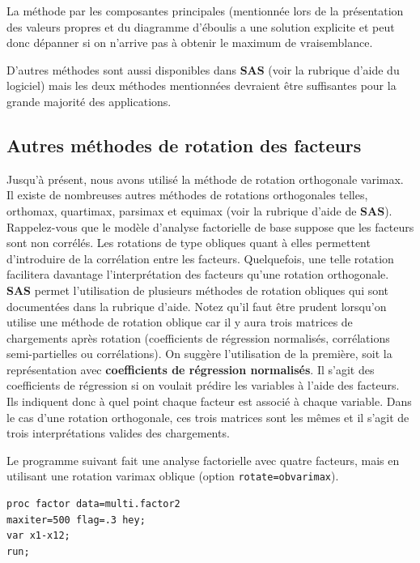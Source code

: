 \documentclass[
  11pt,
  letterpaper,
]{book}
\theoremstyle{definition}
\theoremstyle{definition}
\theoremstyle{definition}
\theoremstyle{remark}
\begin{document}
La méthode par les composantes principales (mentionnée lors de la présentation des valeurs propres et du diagramme d'éboulis a une solution explicite et peut donc dépanner si on n'arrive pas à obtenir le maximum de vraisemblance.

D'autres méthodes sont aussi disponibles dans \textbf{SAS} (voir la rubrique d'aide du logiciel) mais les deux méthodes mentionnées devraient être suffisantes pour la grande majorité des applications.

\hypertarget{autres-muxe9thodes-de-rotation-des-facteurs}{%
\subsection{Autres méthodes de rotation des facteurs}\label{autres-muxe9thodes-de-rotation-des-facteurs}}

Jusqu'à présent, nous avons utilisé la méthode de rotation orthogonale varimax. Il existe de nombreuses autres méthodes de rotations orthogonales telles, orthomax, quartimax, parsimax et equimax (voir la rubrique d'aide de \textbf{SAS}). Rappelez-vous que le modèle d'analyse factorielle de base suppose que les facteurs sont non corrélés. Les rotations de type obliques quant à elles permettent d'introduire de la corrélation entre les facteurs. Quelquefois, une telle rotation facilitera davantage l'interprétation des facteurs qu'une rotation orthogonale. \textbf{SAS} permet l'utilisation de plusieurs méthodes de rotation obliques qui sont documentées dans la rubrique d'aide. Notez qu'il faut être prudent lorsqu'on utilise une méthode de rotation oblique car il y aura trois matrices de chargements après rotation (coefficients de régression normalisés, corrélations semi-partielles ou corrélations). On suggère l'utilisation de la première, soit la représentation avec \textbf{coefficients de régression normalisés}. Il s'agit des coefficients de régression si on voulait prédire les variables à l'aide des facteurs. Ils indiquent donc à quel point chaque facteur est associé à chaque variable. Dans le cas d'une rotation orthogonale, ces trois matrices sont les mêmes et il s'agit de trois interprétations valides des chargements.

Le programme suivant fait une analyse factorielle avec quatre facteurs, mais en utilisant une rotation varimax oblique (option \texttt{rotate=obvarimax}).

\begin{verbatim}
proc factor data=multi.factor2
maxiter=500 flag=.3 hey;
var x1-x12;
run;
\end{verbatim}
\end{document}
